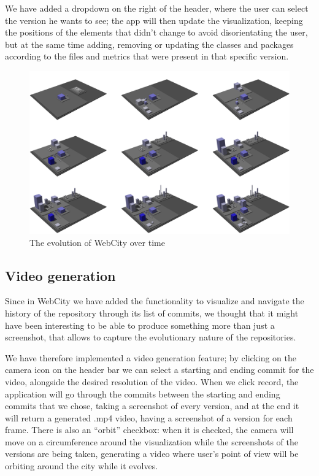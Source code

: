 \documentclass[]{usiinfbachelorproject}
\begin{document}
 We have added a dropdown on the right of the header, where the user can select the version he wants to see; the app will then update the visualization,  keeping the positions of the elements that didn't change to avoid disorientating the user, but at the same time adding, removing or updating the classes and packages according to the files and metrics that were present in that specific version.

 \begin{figure} [H]
 \centering
 \includegraphics[width=1\textwidth]{pictures/evolution.png}
 \caption{The evolution of WebCity over time}
 \label{fig:evolutionq}
 \end{figure}

\pagebreak

\subsection{Video generation} \label{Video generation}
Since in WebCity we have added the functionality to visualize and navigate the history of the repository through its list of commits, we thought that it might have been interesting to be able to produce something more than just a screenshot, that allows to capture the evolutionary nature of the repositories.

We have therefore implemented a video generation feature; by clicking on the camera icon on the header bar we can select a starting and ending commit for the video, alongside the desired resolution of the video. When we click record, the application will go through the commits between the starting and ending commits that we chose, taking a screenshot of every version, and at the end it will return a generated .mp4 video, having a screenshot of a version for each frame.
There is also an ``orbit'' checkbox: when it is checked, the camera will move on a circumference around the visualization while the screenshots of the versions are being taken, generating a video where user's point of view will be orbiting around the city while it evolves.
\end{document}
